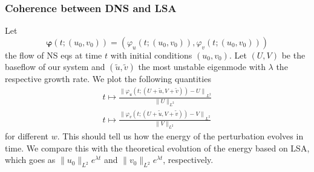 \documentclass[
  aspectratio=169, %
  t, %
  onlytextwidth, %
  10pt, %
]{beamer}
\begin{document}
\begin{frame}
  \frametitle{Coherence between DNS and LSA}
  Let 
  $$
  \boldsymbol{\varphi}(t;(u_0, v_0))=(\varphi_u(t;(u_0,v_0)),\varphi_v(t;(u_0,v_0)))
  $$ the flow of NS eqs at time $t$ with initial conditions $(u_0,v_0)$. Let $(U,V)$ be the baseflow of our system and $(\tilde{u},\tilde{v})$ the most unstable eigenmode with $\lambda$ the respective growth rate. We plot the following quantities
  \begin{align*}
  t\mapsto \frac{\|{\varphi_u(t;(U+\tilde{u},V+\tilde{v}))-U\|}_{L^2}}{\|{U}\|_{L^2}}\\
  t\mapsto \frac{\|{\varphi_v(t;(U+\tilde{u},V+\tilde{v}))-V\|}_{L^2}}{\|{V}\|_{L^2}}
  \end{align*}
  for different $w$. This should tell us how the energy of the perturbation evolves in time. We compare this with the theoretical evolution of the energy based on LSA, which goes as $\|u_0\|_{L^2}e^{\lambda t}$ and $\|v_0\|_{L^2}e^{\lambda t}$, respectively.
\end{frame}
\end{document}
